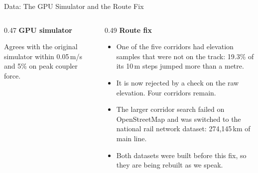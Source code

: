 \documentclass[aspectratio=169,11pt]{beamer}
\begin{document}
\begin{frame}{Data: The GPU Simulator and the Route Fix}
  \vspace{0.2em}
  \begin{columns}[T,onlytextwidth]
    \begin{column}{0.47\textwidth}
      {\small\textbf{GPU simulator}}
      \vspace{0.4em}
      \begin{center}
        \vspace{0.4em}
      \end{center}
      {\footnotesize Agrees with the original simulator within 0.05\,m/s and
       5\% on peak coupler force.}
    \end{column}
    \begin{column}{0.49\textwidth}
      {\small\textbf{Route fix}}
      \vspace{0.3em}
      \begin{itemize}\setlength\itemsep{0.35em}
        \footnotesize
        \item One of the five corridors had elevation samples that were not on
              the track: 19.3\% of its 10\,m steps jumped more than a metre.
        \item It is now rejected by a check on the raw elevation. Four
              corridors remain.
        \item The larger corridor search failed on OpenStreetMap and was
              switched to the national rail network dataset: 274,145\,km of
              main line.
        \item \alert{Both datasets were built before this fix}, so they are being rebuilt as we speak.
      \end{itemize}
    \end{column}
  \end{columns}
\end{frame}


\newcommand{\gpucard}[3]{%
\begin{tikzpicture}[baseline=(h.north)]
  \node[fill=uniMist!55,text width=\dimexpr\linewidth-12pt\relax,inner sep=5pt,
        align=left,anchor=north west,font=\scriptsize] (h)
       {{\color{uniNavy}\footnotesize\bfseries #1}\\[2pt]#3};
  \draw[uniNavy,line width=2.4pt] (h.north west) -- (h.south west);
  \node[anchor=north east,fill=white,draw=chartBlue,rounded corners=1.5pt,
        font=\scriptsize\bfseries,text=chartBlue!80!black,inner sep=2.5pt]
       at ([xshift=-4pt,yshift=-3.5pt]h.north east) {#2};
\end{tikzpicture}}
\end{document}
